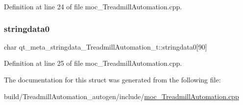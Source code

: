 Definition at line 24 of file moc\+\_\+\+Treadmill\+Automation.\+cpp.

\mbox{\label{structqt__meta__stringdata___treadmill_automation__t_a976913c0cbfb9ef3d5616762b0123605}} 
\subsubsection{\texorpdfstring{stringdata0}{stringdata0}}
{\footnotesize\ttfamily char qt\+\_\+meta\+\_\+stringdata\+\_\+\+Treadmill\+Automation\+\_\+t\+::stringdata0\mbox{[}90\mbox{]}}



Definition at line 25 of file moc\+\_\+\+Treadmill\+Automation.\+cpp.



The documentation for this struct was generated from the following file\+:\begin{DoxyCompactItemize}
\item 
build/\+Treadmill\+Automation\+\_\+autogen/include/\hyperlink{moc___treadmill_automation_8cpp}{moc\+\_\+\+Treadmill\+Automation.\+cpp}\end{DoxyCompactItemize}

